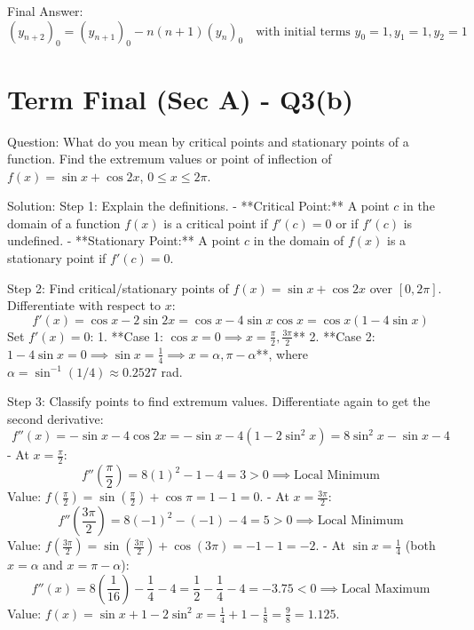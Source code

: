 \documentclass{article}
\begin{document}
Final Answer:
\[
\boxed{(y_{n+2})_0 = (y_{n+1})_0 - n(n+1)(y_n)_0 \quad \text{with initial terms } y_0=1, y_1=1, y_2=1}
\]

\section*{Term Final (Sec A) - Q3(b)}
Question:
What do you mean by critical points and stationary points of a function. Find the extremum values or point of inflection of $f(x) = \sin x + \cos 2x$, $0 \le x \le 2\pi$.

Solution:
Step 1: Explain the definitions.
- **Critical Point:** A point $c$ in the domain of a function $f(x)$ is a critical point if $f'(c) = 0$ or if $f'(c)$ is undefined.
- **Stationary Point:** A point $c$ in the domain of $f(x)$ is a stationary point if $f'(c) = 0$.

Step 2: Find critical/stationary points of $f(x) = \sin x + \cos 2x$ over $[0, 2\pi]$.
Differentiate with respect to $x$:
\[
f'(x) = \cos x - 2\sin 2x = \cos x - 4\sin x\cos x = \cos x(1 - 4\sin x)
\]
Set $f'(x) = 0$:
1. **Case 1: $\cos x = 0 \implies x = \frac{\pi}{2}, \frac{3\pi}{2}$**
2. **Case 2: $1 - 4\sin x = 0 \implies \sin x = \frac{1}{4} \implies x = \alpha, \pi-\alpha$**, where $\alpha = \sin^{-1}(1/4) \approx 0.2527$ rad.

Step 3: Classify points to find extremum values.
Differentiate again to get the second derivative:
\[
f''(x) = -\sin x - 4\cos 2x = -\sin x - 4(1 - 2\sin^2 x) = 8\sin^2 x - \sin x - 4
\]
- At $x = \frac{\pi}{2}$:
  \[
  f''\left(\frac{\pi}{2}\right) = 8(1)^2 - 1 - 4 = 3 > 0 \implies \text{Local Minimum}
  \]
  Value: $f(\frac{\pi}{2}) = \sin(\frac{\pi}{2}) + \cos\pi = 1 - 1 = 0$.
- At $x = \frac{3\pi}{2}$:
  \[
  f''\left(\frac{3\pi}{2}\right) = 8(-1)^2 - (-1) - 4 = 5 > 0 \implies \text{Local Minimum}
  \]
  Value: $f(\frac{3\pi}{2}) = \sin(\frac{3\pi}{2}) + \cos(3\pi) = -1 - 1 = -2$.
- At $\sin x = \frac{1}{4}$ (both $x=\alpha$ and $x=\pi-\alpha$):
  \[
  f''(x) = 8\left(\frac{1}{16}\right) - \frac{1}{4} - 4 = \frac{1}{2} - \frac{1}{4} - 4 = -3.75 < 0 \implies \text{Local Maximum}
  \]
  Value: $f(x) = \sin x + 1 - 2\sin^2 x = \frac{1}{4} + 1 - \frac{1}{8} = \frac{9}{8} = 1.125$.
\end{document}
